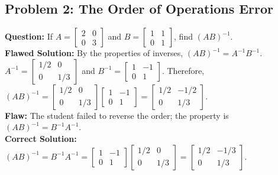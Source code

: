 \documentclass[11pt]{article}
\begin{document}
\subsection{Problem 2: The Order of Operations Error}
\textbf{Question:} If $A = \begin{bmatrix} 2 & 0 \\ 0 & 3 \end{bmatrix}$ and $B = \begin{bmatrix} 1 & 1 \\ 0 & 1 \end{bmatrix}$, find $(AB)^{-1}$.
\\
\textbf{Flawed Solution:}
By the properties of inverses, $(AB)^{-1} = A^{-1} B^{-1}$.
$A^{-1} = \begin{bmatrix} 1/2 & 0 \\ 0 & 1/3 \end{bmatrix}$ and $B^{-1} = \begin{bmatrix} 1 & -1 \\ 0 & 1 \end{bmatrix}$.
Therefore, $(AB)^{-1} = \begin{bmatrix} 1/2 & 0 \\ 0 & 1/3 \end{bmatrix} \begin{bmatrix} 1 & -1 \\ 0 & 1 \end{bmatrix} = \begin{bmatrix} 1/2 & -1/2 \\ 0 & 1/3 \end{bmatrix}$.
\\
\textbf{Flaw:} The student failed to reverse the order; the property is $(AB)^{-1} = B^{-1} A^{-1}$.
\\
\textbf{Correct Solution:}
$(AB)^{-1} = B^{-1} A^{-1} = \begin{bmatrix} 1 & -1 \\ 0 & 1 \end{bmatrix} \begin{bmatrix} 1/2 & 0 \\ 0 & 1/3 \end{bmatrix} = \begin{bmatrix} 1/2 & -1/3 \\ 0 & 1/3 \end{bmatrix}$.
\end{document}

